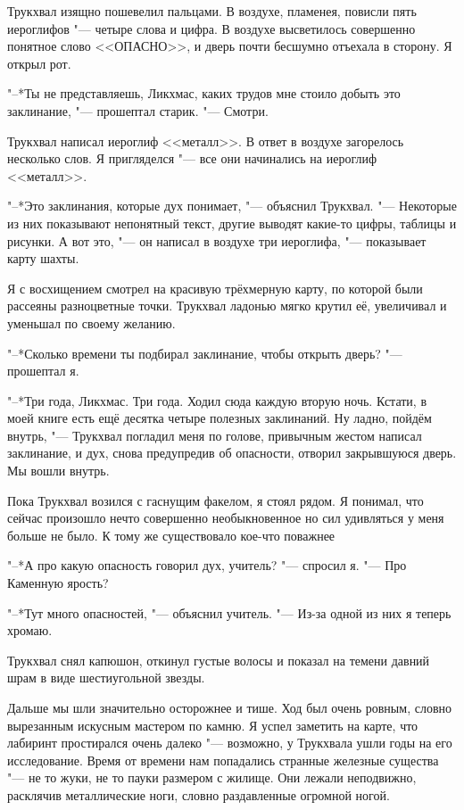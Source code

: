 Трукхвал изящно пошевелил пальцами.
В воздухе, пламенея, повисли пять иероглифов "--- четыре слова и цифра.
В воздухе высветилось совершенно понятное слово <<ОПАСНО>>, и дверь почти бесшумно отъехала в сторону.
Я открыл рот.

"--*Ты не представляешь, Ликхмас, каких трудов мне стоило добыть это заклинание, "--- прошептал старик.
"--- Смотри.

Трукхвал написал иероглиф <<металл>>.
В ответ в воздухе загорелось несколько слов.
Я пригляделся "--- все они начинались на иероглиф <<металл>>.

"--*Это заклинания, которые дух понимает, "--- объяснил Трукхвал.
"--- Некоторые из них показывают непонятный текст, другие выводят какие-то цифры, таблицы и рисунки.
А вот это, "--- он написал в воздухе три иероглифа, "--- показывает карту шахты.

Я с восхищением смотрел на красивую трёхмерную карту, по которой были рассеяны разноцветные точки.
Трукхвал ладонью мягко крутил её, увеличивал и уменьшал по своему желанию.

"--*Сколько времени ты подбирал заклинание, чтобы открыть дверь? "--- прошептал я.

"--*Три года, Ликхмас.
Три года.
Ходил сюда каждую вторую ночь.
Кстати, в моей книге есть ещё десятка четыре полезных заклинаний.
Ну ладно, пойдём внутрь, "--- Трукхвал погладил меня по голове, привычным жестом написал заклинание, и дух, снова предупредив об опасности, отворил закрывшуюся дверь.
Мы вошли внутрь.

Пока Трукхвал возился с гаснущим факелом, я стоял рядом.
Я понимал, что сейчас произошло нечто совершенно необыкновенное но сил удивляться у меня больше не было.
К тому же существовало кое-что поважнее\ldotst

"--*А про какую опасность говорил дух, учитель? "--- спросил я.
"--- Про Каменную ярость?

"--*Тут много опасностей, "--- объяснил учитель.
"--- Из-за одной из них я теперь хромаю.

Трукхвал снял капюшон, откинул густые волосы и показал на темени давний шрам в виде шестиугольной звезды.

\razd

Дальше мы шли значительно осторожнее и тише.
Ход был очень ровным, словно вырезанным искусным мастером по камню.
Я успел заметить на карте, что лабиринт простирался очень далеко "--- возможно, у Трукхвала ушли годы на его исследование.
Время от времени нам попадались странные железные существа "--- не то жуки, не то пауки размером с жилище.
Они лежали неподвижно, расклячив металлические ноги, словно раздавленные огромной ногой.

